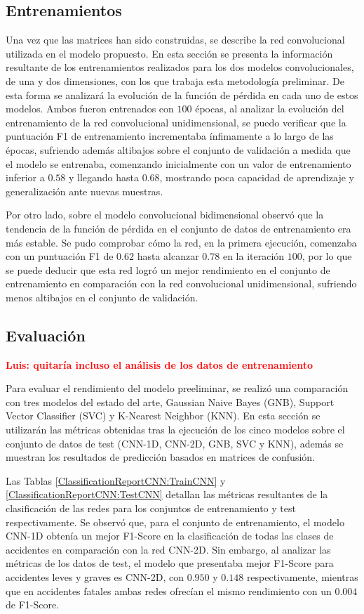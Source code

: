 \subsection*{Entrenamientos}

Una vez que las matrices han sido construidas, se describe la red convolucional utilizada en el modelo propuesto. En esta sección se presenta la información resultante de los entrenamientos realizados para los dos modelos convolucionales, de una y dos dimensiones, con los que trabaja esta metodología preliminar. De esta forma se analizará la evolución de la función de pérdida en cada uno de estos modelos. Ambos fueron entrenados con $100$ épocas, al analizar la evolución del entrenamiento de la red convolucional unidimensional, se puedo verificar que la puntuación F1 de entrenamiento incrementaba ínfimamente a lo largo de las épocas, sufriendo además altibajos sobre el conjunto de validación a medida que el modelo se entrenaba, comenzando inicialmente con un valor de entrenamiento inferior a $0.58$ y llegando hasta $0.68$, mostrando poca capacidad de aprendizaje y generalización ante nuevas muestras.

Por otro lado, sobre el modelo convolucional bidimensional observó que la tendencia de la función de pérdida en el conjunto de datos de entrenamiento era más estable. Se pudo comprobar cómo la red, en la primera ejecución, comenzaba con un puntuación F1 de $0.62$ hasta alcanzar $0.78$ en la iteración $100$, por lo que se puede deducir que esta red logró un mejor rendimiento en el conjunto de entrenamiento en comparación con la red convolucional unidimensional, sufriendo menos altibajos en el conjunto de validación.


\subsection*{Evaluación}

\textcolor{red}{\textbf{Luis: quitaría incluso el análisis de los datos de entrenamiento}}

Para evaluar el rendimiento del modelo preeliminar, se realizó una comparación con tres modelos del estado del arte, Gaussian Naive Bayes (GNB), Support Vector Classifier (SVC) y K-Nearest Neighbor (KNN). En esta sección se utilizarán las métricas obtenidas tras la ejecución de los cinco modelos sobre el conjunto de datos de test (CNN-1D, CNN-2D, GNB, SVC y KNN), además se muestran los resultados de predicción basados en matrices de confusión.

Las Tablas \ref{ClassificationReportCNN:TrainCNN} y \ref{ClassificationReportCNN:TestCNN} detallan las métricas resultantes de la clasificación de las redes para los conjuntos de entrenamiento y test respectivamente. Se observó que, para el conjunto de entrenamiento, el modelo CNN-1D obtenía un mejor F1-Score en la clasificación de todas las clases de accidentes en comparación con la red CNN-2D. Sin embargo, al analizar las métricas de los datos de test, el modelo que presentaba mejor F1-Score para accidentes leves y graves es CNN-2D, con $0.950$ y $0.148$ respectivamente, mientras que en accidentes fatales ambas redes ofrecían el mismo rendimiento con un $0.004$ de F1-Score.

